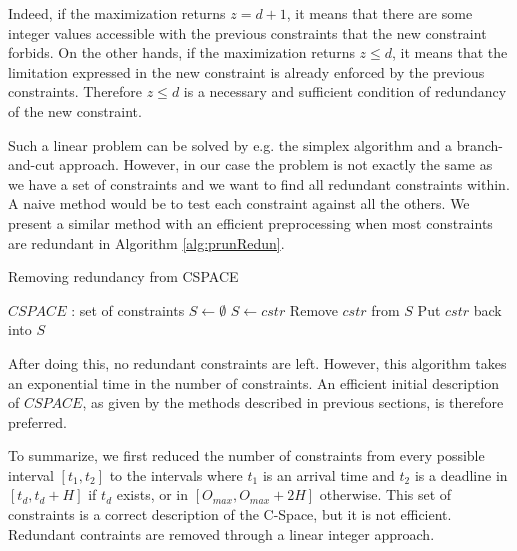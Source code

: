 \documentclass[conference]{IEEEtran}
\begin{document}
Indeed, if the maximization returns $z=d+1$, it means that there are some integer values accessible with the previous constraints that the new constraint forbids. On the other hands, if the maximization returns $z \leq d$, it means that the limitation expressed in the new constraint is already enforced by the previous constraints. Therefore $z \leq d$ is a necessary and sufficient condition of redundancy of the new constraint.

Such a linear problem can be solved by e.g. the simplex algorithm and a branch-and-cut approach. However, in our case the problem is not exactly the same as we have a set of constraints and we want to find all redundant constraints within. A naive method would be to test each constraint against all the others. We present a similar method with an efficient preprocessing when most constraints are redundant in Algorithm \ref{alg:prunRedun}.

\begin{algorithm}
\caption{Removing redundancy from CSPACE}
\label{alg:prunRedun}
  \begin{algorithmic}[1]
    \STATE $CSPACE$ : set of constraints
    \STATE $S \leftarrow \emptyset$
    \STATE {}
        \STATE $S \leftarrow cstr$
      \ENDIF
    \ENDFOR
    \STATE {}
      \STATE Remove $cstr$ from $S$
        \STATE Put $cstr$ back into $S$
      \ENDIF
    \ENDFOR
  \end{algorithmic}
\end{algorithm}

After doing this, no redundant constraints are left. However, this algorithm
takes an exponential time in the number of constraints. An efficient initial
description of $CSPACE$, as given by the methods described in previous
sections, is therefore preferred.

To summarize, we first reduced the number of constraints from every possible
interval $[t_1, t_2]$ to the intervals where $t_1$ is an arrival time and
$t_2$ is a deadline in $[t_d, t_d + H]$ if $t_d$ exists, or in
$[O_{max}, O_{max} + 2H]$ otherwise. This set of constraints is a
correct description of the C-Space, but it is not efficient. Redundant
contraints are removed through a linear integer approach.
\end{document}
